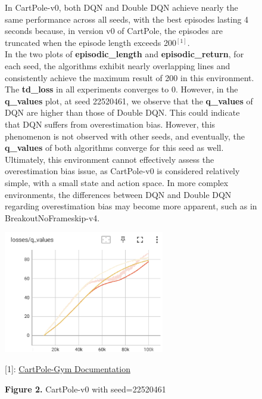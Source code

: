 \documentclass[english, a4paper,12pt]{article}
\begin{document}
\begin{figure}[h!]
\begin{minipage}{0.5\textwidth}
    \end{minipage}%
    \begin{minipage}{0.5\textwidth}
        \hspace*{5mm}In CartPole-v0, both DQN and Double DQN achieve nearly the same performance across all seeds, with the best episodes lasting 4 seconds because, in version v0 of CartPole, the episodes are truncated when the episode length exceeds 200$^{[1]}$.
        \\
        \hspace*{5mm}In the two plots of \textbf{episodic\_length} and \textbf{episodic\_return}, for each seed, the algorithms exhibit nearly overlapping lines and consistently achieve the maximum result of 200 in this environment. The \textbf{td\_loss} in all experiments converges to 0. However, in the \textbf{q\_values} plot, at seed 22520461, we observe that the \textbf{q\_values} of DQN are higher than those of Double DQN. This could indicate that DQN suffers from overestimation bias. However, this phenomenon is not observed with other seeds, and eventually, the \textbf{q\_values} of both algorithms converge for this seed as well. Ultimately, this environment cannot effectively assess the overestimation bias issue, as CartPole-v0 is considered relatively simple, with a small state and action space. In more complex environments, the differences between DQN and Double DQN regarding overestimation bias may become more apparent, such as in BreakoutNoFrameskip-v4.

        \begin{center}
            \includegraphics[width=7cm]{q_values_cartpole_22520461.png}
            \caption*{\footnotesize \textbf{Figure 2.} CartPole-v0 with seed=22520461} %
        \end{center}
        \footnotesize [1]: \href{https://www.gymlibrary.dev/environments/classic_control/cart_pole/}{CartPole-Gym Documentation}
    \end{minipage}
\end{figure}
\newpage
\end{document}
